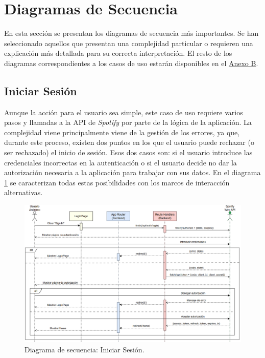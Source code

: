 \section{Diagramas de Secuencia}

En esta sección se presentan los diagramas de secuencia más importantes. Se han seleccionado aquellos que presentan una complejidad particular o requieren una explicación más detallada para su correcta interpretación. El resto de los diagramas correspondientes a los casos de uso estarán disponibles en el \hyperref[ch:anexoB]{Anexo B}.

\subsection*{Iniciar Sesión}

Aunque la acción para el usuario sea simple, este caso de uso requiere varios pasos y llamadas a la API de \textit{Spotify} por parte de la lógica de la aplicación. La complejidad viene principalmente viene de la gestión de los errores, ya que, durante este proceso, existen dos puntos en los que el usuario puede rechazar (o ser rechazado) el inicio de sesión. Esos dos casos son: si el usuario introduce las credenciales incorrectas en la autenticación o si el usuario decide no dar la autorización necesaria a la aplicación para trabajar con sus datos. En el diagrama \ref{fig:ds_iniciar_sesion} se caracterizan todas estas posibilidades con los marcos de interacción alternativas.

\begin{figure}[H]
    \centering
    \includegraphics[width=\textwidth]{figures/diagramas_secuencia/ds_iniciar_sesion.png}
    \caption{Diagrama de secuencia: Iniciar Sesión.}
    \label{fig:ds_iniciar_sesion}
\end{figure}

